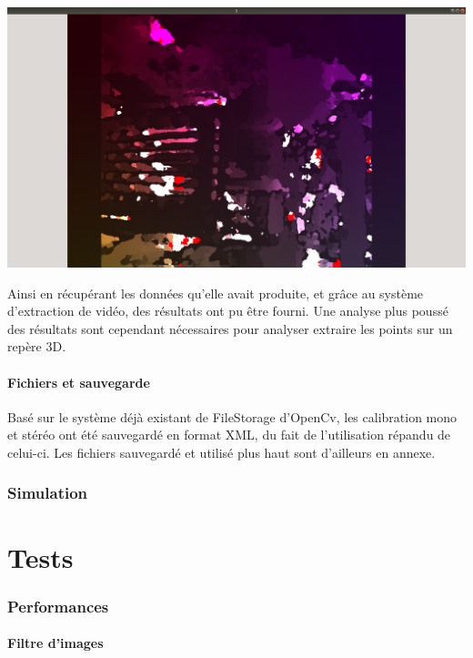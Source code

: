 \documentclass{article}
\begin{document}
\includegraphics[width=\linewidth]{img/d_sgbm.png}

Ainsi en récupérant les données qu'elle avait produite, et grâce au système d'extraction de vidéo, des résultats ont pu être fourni. 
Une analyse plus poussé des résultats sont cependant nécessaires pour analyser extraire les points sur un repère 3D.

\par\leavevmode\par
\subsection{Fichiers et sauvegarde}

Basé sur le système déjà existant de FileStorage d'OpenCv, les calibration mono et stéréo ont été sauvegardé en format XML, du fait de l'utilisation répandu de celui-ci.
Les fichiers sauvegardé et utilisé plus haut sont d'ailleurs en annexe.

    
\newpage
\section{Simulation}


\newpage
\part{Tests}

\section{Performances}

\subsection{Filtre d'images}
\end{document}
